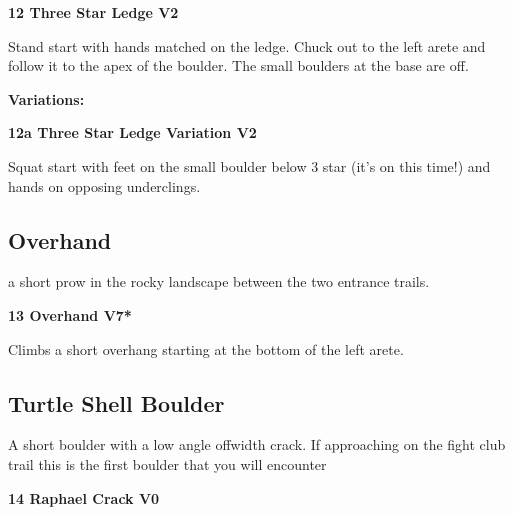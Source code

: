 \begin{multicols}{2}

			\label{rt:Three Star Ledge}
\colorbox{green!20}{
\parbox{0.95\linewidth}{
\textbf{
12 Three Star Ledge V2  
}
}
}

			\begin{adjustwidth}{0.5cm}{}				
			Stand start with hands matched on the ledge. Chuck out to the left arete and follow it to the apex of the boulder. The small boulders at the base are off.
			\end{adjustwidth}
				\begin{adjustwidth}{0.5cm}{}				
				\textbf{Variations:} \newline
					\label{vr:Three Star Ledge Variation}
\colorbox{green!20}{
\parbox{0.95\linewidth}{
\textbf{
12a Three Star Ledge Variation V2  
}
}
}

					\begin{adjustwidth}{0.5cm}{}				
					Squat start with feet on the small boulder below 3 star (it's on this time!) and hands on opposing underclings.
					\end{adjustwidth}
				\end{adjustwidth}
		\subsection*{Overhand}\label{bf:Overhand}
		a short prow in the rocky landscape between the two entrance trails.\\
	

			\label{rt:Overhand}
\colorbox{Goldenrod!50}{
\parbox{0.95\linewidth}{
\textbf{
13 Overhand V7*  
}
}
}

			\begin{adjustwidth}{0.5cm}{}				
			Climbs a short overhang starting at the bottom of the left arete.
			\end{adjustwidth}
		\subsection*{Turtle Shell Boulder}\label{bf:Turtle Shell Boulder}
		A short boulder with a low angle offwidth crack. If approaching on the fight club trail this is the first boulder that you will encounter\\
	

			\label{rt:Raphael Crack}
\colorbox{green!20}{
\parbox{0.95\linewidth}{
\textbf{
14 Raphael Crack V0  
}
}
}


\end{multicols}
